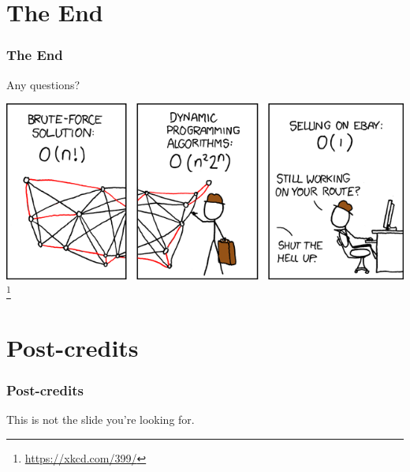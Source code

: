 \documentclass[aspectratio=169]{beamer}
\begin{document}
\section{The End}

\begin{frame}
\frametitle{The End}
\begin{center}
Any questions?

\includegraphics[scale=0.5]{xkcd}\footnote{\url{https://xkcd.com/399/}}
\end{center}
\end{frame}

\section{Post-credits}

\begin{frame}
\frametitle{Post-credits}
\centerline{This is not the slide you're looking for.}
\end{frame}

\end{document}
